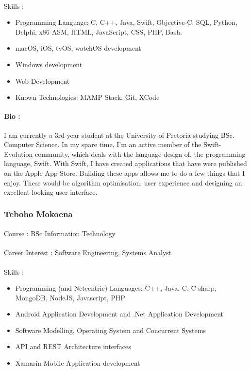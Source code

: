 \documentclass[11pt]{article}
\begin{document}
\paragraph{}Skills :
\begin{itemize}

\item Programming Language: C, C++, Java, Swift, Objective-C, SQL, Python, Delphi, x86 ASM, HTML, JavaScript, CSS, PHP, Bash.
\item macOS, iOS, tvOS, watchOS development
\item Windows development 
\item Web Development
\item Known Technologies: MAMP Stack, Git, XCode
\end{itemize}
\paragraph{Bio :}I am currently a 3rd-year student at the University of Pretoria studying BSc. Computer Science. In my spare time, I'm an active member of the Swift-Evolution community, which deals with the language design of, the programming language, Swift. With Swift, I have created applications that have were published on the Apple App Store. Building these apps allows me to do a few things that I enjoy. These would be algorithm optimisation, user experience and designing an excellent looking user interface.

\subsubsection{Teboho Mokoena}
\paragraph{}Course : BSc Information Technology 
\paragraph{}Career Interest : Software Engineering, Systems Analyst
\paragraph{}Skills :
\begin{itemize}
\item Programming (and Netcentric) Languages: C++, Java, C, C sharp, MongoDB, NodeJS, Javascript, PHP
\item Android Application Development and .Net Application Development
\item Software Modelling, Operating System and Concurrent Systems
\item API and REST Architecture interfaces
\item Xamarin Mobile Application development
\end{itemize}
\end{document}
